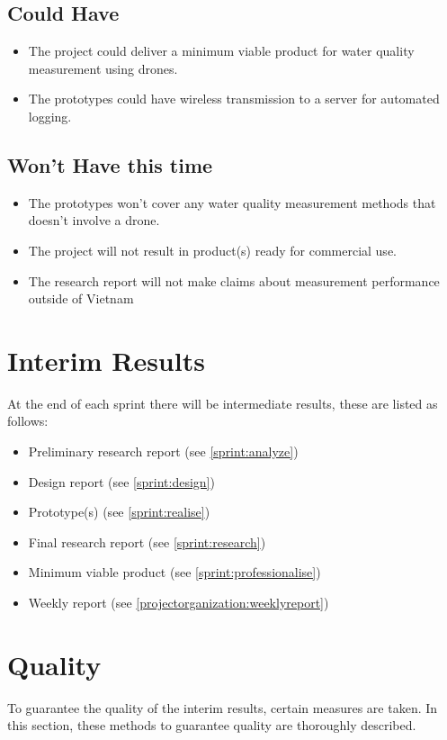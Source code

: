 \documentclass[11pt, a4paper]{article}
\begin{document}
\subsection{Could Have}
\begin{itemize}
  \item The project could deliver a minimum viable product for water quality measurement using drones.
  \item The prototypes could have wireless transmission to a server for automated logging.
\end{itemize}
\subsection{Won’t Have this time}
\begin{itemize}
  \item The prototypes won't cover any water quality measurement methods that doesn't involve a drone.
  \item The project will not result in product(s) ready for commercial use.
  \item The research report will not make claims about measurement performance outside of Vietnam
\end{itemize}
\pagebreak
\section{Interim Results}\label{interimresults}
At the end of each sprint there will be intermediate results, these are listed as follows:
\begin{itemize}
  \item Preliminary research report (see \ref{sprint:analyze})
  \item Design report (see \ref{sprint:design})
  \item Prototype(s) (see \ref{sprint:realise})
  \item Final research report (see \ref{sprint:research})
  \item Minimum viable product (see \ref{sprint:professionalise})
  \item Weekly report (see \ref{projectorganization:weeklyreport})
\end{itemize}

\section{Quality}
To guarantee the quality of the interim results, certain measures are taken. In this section, these methods to guarantee quality are thoroughly described.
\end{document}
